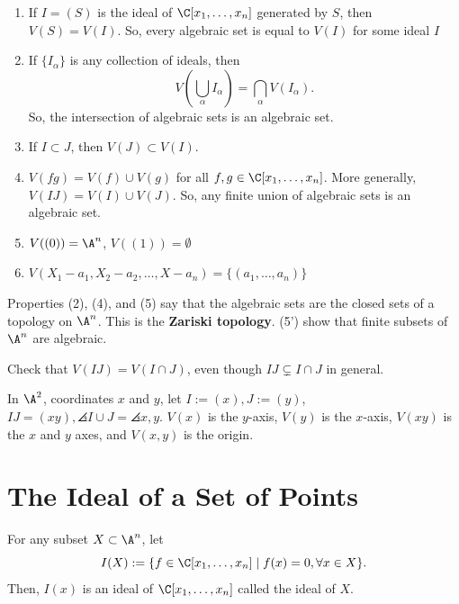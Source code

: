 \begin{prop}
    \begin{enumerate}
        \item If $I=(S)$ is the ideal of $\C[x_1,\dots,x_n]$ generated by $S$, then $V(S) = V(I)$. So, every algebraic set is equal to $V(I)$ for some ideal $I$
        \item If $\{I_\alpha\}$ is any collection of ideals, then
        $$V(\bigcup_{\alpha}I_\alpha) = \bigcap_{\alpha}V(I_\alpha).$$
        So, the intersection of algebraic sets is an algebraic set.
        \item If $I \subset J$, then $V(J) \subset V(I)$.
        \item $V(fg) = V(f) \cup V(g)$ for all $f,g \in \C[x_1,\dots,x_n]$. More generally, $V(IJ) = V(I) \cup V(J)$. So, any finite union of algebraic sets is an algebraic set.
        \item $V((0)) = \A^n$, $V((1))=\emptyset$
        \item[(5')] $V(X_1-a_1,X_2-a_2,\dots,X-a_n)=\{(a_1,\dots,a_n)\}$
    \end{enumerate}
    Properties (2), (4), and (5) say that the algebraic sets are the closed sets of a topology on $\A^n$. This is the \textbf{Zariski topology}. (5') show that finite subsets of $\A^n$ are algebraic.
\end{prop}

\begin{notebox*}[Exercise]
    Check that $V(IJ)=V(I \cap J)$, even though $IJ \subsetneq I \cap J$ in general.
\end{notebox*}

\begin{ex}
    In $\A^2$, coordinates $x$ and $y$, let $I:= (x),J:=(y)$, $IJ=(xy),\angles{I \cup J}=\angles{x,y}$. $V(x)$ is the $y$-axis, $V(y)$ is the $x$-axis, $V(xy)$ is the $x$ and $y$ axes, and $V(x,y)$ is the origin.
\end{ex}

\section{The Ideal of a Set of Points}

\begin{defn}
    For any subset $X \subset \A^n$, let
    $$I(X) := \{ f \in \C[x_1,\dots,x_n] \mid f(x) = 0 ,\forall x \in X\}.$$
    Then, $I(x)$ is an ideal of $\C[x_1,\dots,x_n]$ called the ideal of $X$.
\end{defn}

